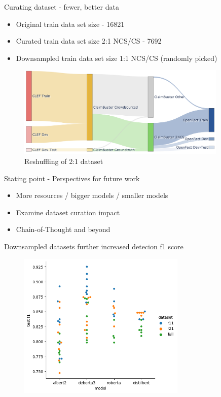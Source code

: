 \documentclass[aspectratio=149]{beamer}
\begin{document}
\begin{frame}{Curating dataset - fewer, better data}
\begin{itemize}
  \item Original train data set size - 16821
  \item Curated train data set size 2:1 NCS/CS - 7692
  \item Downsampled train data set size 1:1 NCS/CS (randomly picked)

\end{itemize}

\begin{figure}[h]
    \centering
    \includegraphics[width=10cm]{./sank}
\caption{Reshuffling of 2:1 dataset}
\end{figure}
\end{frame}
\begin{frame}{Stating point - Perspectives for future work}
  \begin{itemize}
\item More resources / bigger models / smaller models
\item Examine dataset curation impact
\item Chain-of-Thought and beyond
\end{itemize}

\end{frame}
\begin{frame}{Downsampled datasets further increased detecion f1 score}
\begin{figure}[h]
\centering
\includegraphics[width=8cm]{./f1}
\end{figure}
\end{frame}
\end{document}
